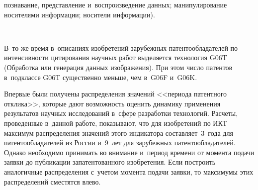 \begin{multicols}{2}


\noindent
познавание, представление и~воспроизведение данных; 
манипулирование носителями информации; носители информации).

\begin{figure*} %
\vspace*{1pt}
 \begin{center}
 \mbox{%
 \epsfxsize=147.503mm
 }
 \end{center}
 \vspace*{-9pt}
     \end{figure*}
 

В~то же 
время в~описаниях изобретений зарубежных патентообладателей по 
интенсивности цитирования научных работ выделяется технология G06T 
(Обработка или генерация данных изображения). При этом число патентов 
в~подклассе G06T существенно меньше, чем в~G06F и~G06K.
     
     Впервые были получены распределения значений <<периода патентного 
отклика>>, которые дают возможность оценить динамику применения 
результатов научных исследований в~сфере разработки технологий. Расчеты, 
проведенные в~данной работе, показывают, что для изобретений по ИКТ 
максимум распределения значений этого индикатора составляет~3~года для 
патентообладателей из России и~9~лет для зарубежных патентообладателей. 
Однако необходимо принимать во внимание и~период времени от момента подачи 
заявки до публикации запатентованного изобретения. Если построить 
аналогичные распределения с~учетом момента подачи заявки, то максимумы этих 
распределений сместятся влево.


\vspace*{-9pt}
  

\end{multicols}
